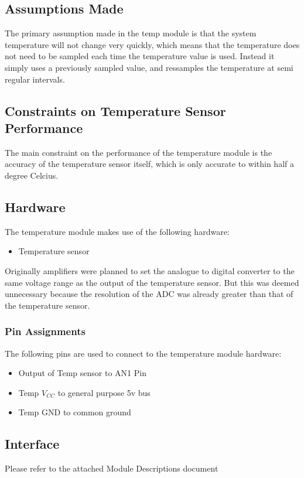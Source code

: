 \documentclass[]{report}
\begin{document}
\subsection{Assumptions Made}
The primary assumption made in the temp module is that the system temperature will not change very quickly, which means that the temperature does not need to be sampled each time the temperature value is used. Instead it simply uses a previously sampled value, and ressamples the temperature at semi regular intervals.

\subsection{Constraints on Temperature Sensor Performance}
The main constraint on the performance of the temperature module is the accuracy of the temperature sensor itself, which is only accurate to within half a degree Celcius. 

\subsection{Hardware}
The temperature module makes use of the following hardware:
\begin{itemize}
	\item Temperature sensor
\end{itemize}
Originally amplifiers were planned to set the analogue to digital converter to the same voltage range as the output of the temperature sensor. But this was deemed unnecessary because the resolution of the ADC was already greater than that of the temperature sensor.

\subsubsection{Pin Assignments}
The following pins are used to connect to the temperature module hardware:
\begin{itemize}
	\item Output of Temp sensor to AN1 Pin
	\item Temp $V_{CC}$ to general purpose 5v bus
	\item Temp GND to common ground
\end{itemize}

\subsection{Interface}
Please refer to the attached Module Descriptions document
\end{document}
